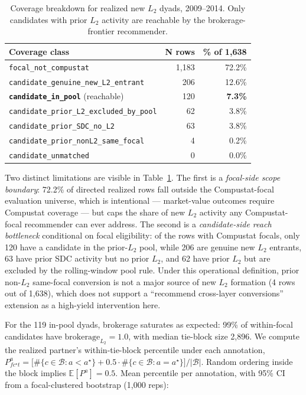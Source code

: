 \documentclass[11pt,letterpaper]{article}
\begin{document}
\begin{table}[H]
\centering
\footnotesize
\caption{Coverage breakdown for realized new $L_2$ dyads,
2009--2014. Only candidates with prior $L_2$ activity are reachable
by the brokerage-frontier recommender.}
\label{tab:coverage}
\begin{tabular}{lrr}
\toprule
Coverage class & N rows & \% of 1{,}638 \\
\midrule
\texttt{focal\_not\_compustat}                & 1{,}183 & 72.2\% \\
\texttt{candidate\_genuine\_new\_L2\_entrant} &   206 & 12.6\% \\
\textbf{\texttt{candidate\_in\_pool}} (reachable) &  120 &  \textbf{7.3\%} \\
\texttt{candidate\_prior\_L2\_excluded\_by\_pool} &  62 &  3.8\% \\
\texttt{candidate\_prior\_SDC\_no\_L2}        &    63 &  3.8\% \\
\texttt{candidate\_prior\_nonL2\_same\_focal} &     4 &  0.2\% \\
\texttt{candidate\_unmatched}                 &     0 &  0.0\% \\
\bottomrule
\end{tabular}
\end{table}

Two distinct limitations are visible in Table~\ref{tab:coverage}.
The first is a \emph{focal-side scope boundary}: 72.2\% of directed
realized rows fall outside the Compustat-focal evaluation universe,
which is intentional --- market-value outcomes require Compustat
coverage --- but caps the share of new $L_2$ activity any
Compustat-focal recommender can ever address.  The second is a
\emph{candidate-side reach bottleneck} conditional on focal
eligibility: of the rows with Compustat focals, only 120 have a
candidate in the prior-$L_2$ pool, while 206 are genuine new $L_2$
entrants, 63 have prior SDC activity but no prior $L_2$, and 62 have
prior $L_2$ but are excluded by the rolling-window pool rule.  Under
this operational definition, prior non-$L_2$ same-focal conversion
is not a major source of new $L_2$ formation (4 rows out of 1{,}638),
which does not support a ``recommend cross-layer conversions''
extension as a high-yield intervention here.

For the 119 in-pool dyads, brokerage saturates as expected: 99\% of
within-focal candidates have $\text{brokerage}_{L_2} = 1.0$, with
median tie-block size 2{,}896.  We compute the realized partner's
within-tie-block percentile under each annotation,
$P^a_{fc^\star t} = \bigl[\#\{c \in \mathcal B : a < a^\star\}
+ 0.5 \cdot \#\{c \in \mathcal B : a = a^\star\}\bigr] / |\mathcal B|$.
Random ordering inside the block implies $\mathbb E[P^a] = 0.5$.
Mean percentile per annotation, with 95\% CI from a focal-clustered
bootstrap (1{,}000 reps):
\end{document}
